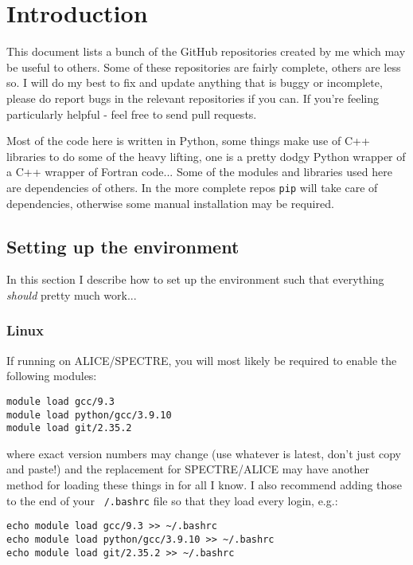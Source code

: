 \chapter{Introduction}

	This document lists a bunch of the GitHub repositories created by me which may be useful to others. Some of these repositories are fairly complete, others are less so. I will do my best to fix and update anything that is buggy or incomplete, please do report bugs in the relevant repositories if you can. If you're feeling particularly helpful - feel free to send pull requests. 
	
	Most of the code here is written in Python, some things make use of C++ libraries to do some of the heavy lifting, one is a pretty dodgy Python wrapper of a C++ wrapper of Fortran code... Some of the modules and libraries used here are dependencies of others. In the more complete repos \texttt{pip} will take care of dependencies, otherwise some manual installation may be required.

	\section{Setting up the environment}

		In this section I describe how to set up the environment such that everything \textit{should} pretty much work...

		\subsection{Linux}
			
			If running on ALICE/SPECTRE, you will most likely be required to enable the following modules:

			\begin{verbatim}
module load gcc/9.3
module load python/gcc/3.9.10
module load git/2.35.2
			\end{verbatim}
			where exact version numbers may change (use whatever is latest, don't just copy and paste!) and the replacement for SPECTRE/ALICE may have another method for loading these things in for all I know. I also recommend adding those to the end of your \texttt{~/.bashrc} file so that they load every login, e.g.:
			\begin{verbatim}
echo module load gcc/9.3 >> ~/.bashrc
echo module load python/gcc/3.9.10 >> ~/.bashrc
echo module load git/2.35.2 >> ~/.bashrc
			\end{verbatim}
			
